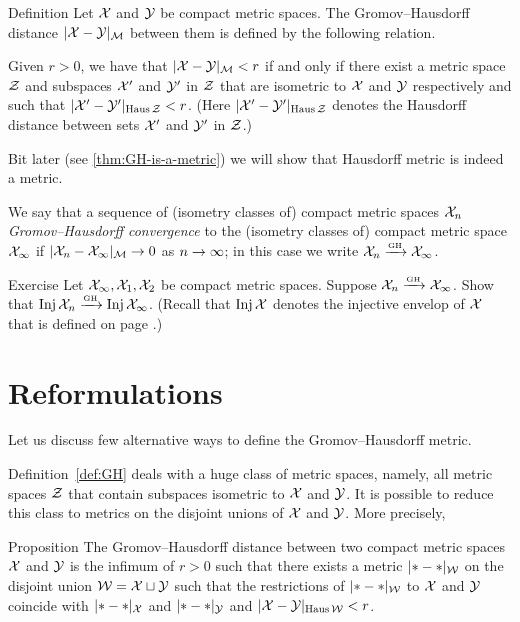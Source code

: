 \begin{thm}{Definition}\label{def:GH}
Let $\mathcal{X}$ and $\mathcal{Y}$ be compact metric spaces. 
The Gromov--Hausdorff distance $|\mathcal{X}-\mathcal{Y}|_{\mathcal{M}}$
between them is defined by the following
relation.
 
Given  $r > 0$, we have that $|\mathcal{X}-\mathcal{Y}|_{\mathcal{M}} < r$ if and only if there exist a metric
space $\mathcal{Z}$ and subspaces $\mathcal{X}'$ and $\mathcal{Y}'$ in $\mathcal{Z}$ that are isometric to $\mathcal{X}$ and $\mathcal{Y}$
respectively and such that $|\mathcal{X}'-\mathcal{Y}'|_{\operatorname{\rm Haus}\nolimits\mathcal{Z}} < r$. 
(Here $|\mathcal{X}'-\mathcal{Y}'|_{\operatorname{\rm Haus}\nolimits\mathcal{Z}}$ denotes the Hausdorff distance between sets $\mathcal{X}'$ and $\mathcal{Y}'$ in $\mathcal{Z}$.)
\end{thm}

Bit later (see \ref{thm:GH-is-a-metric}) we will show that Hausdorff metric is indeed a metric.

We say that a sequence
of (isometry classes of) compact metric spaces $\mathcal{X}_n$ 
\emph{Gromov--Hausdorff convergence} to the (isometry classes of)
compact metric space $\mathcal{X}_\infty$ if $|\mathcal{X}_n - \mathcal{X}_\infty|_{\mathcal{M}} \to 0$ as $n\z\to\infty$;
in this case we write $\mathcal{X}_n\xrightarrow{\mbox{\tiny\rm GH}} \mathcal{X}_\infty$.

\begin{thm}{Exercise}
Let $\mathcal{X}_\infty, \mathcal{X}_1, \mathcal{X}_2$ be compact metric spaces.
Suppose $\mathcal{X}_n\xrightarrow{\mbox{\tiny\rm GH}} \mathcal{X}_\infty$.
Show that $\mathop{\rm Inj}\nolimits\mathcal{X}_n\xrightarrow{\mbox{\tiny\rm GH}} \mathop{\rm Inj}\nolimits\mathcal{X}_\infty$.
(Recall that $\mathop{\rm Inj}\nolimits\mathcal{X}$ denotes the injective envelop of $\mathcal{X}$ that is defined on page \pageref{page:InjX}.)
\end{thm}


\section{Reformulations}

Let us discuss few alternative ways to define the Gromov--Hausdorff metric.

Definition~\ref{def:GH} deals with a huge class of metric spaces,
namely, all metric spaces $\mathcal{Z}$ that contain subspaces isometric to $\mathcal{X}$ and $\mathcal{Y}$.
It is possible to reduce this class to metrics on the disjoint unions of $\mathcal{X}$ and $\mathcal{Y}$. 
More precisely, 

\begin{thm}{Proposition}\label{prop:GH=X+Y}
The Gromov--Hausdorff distance between two compact metric spaces $\mathcal{X}$
and $\mathcal{Y}$ is the infimum of $r > 0$ such that there exists a metric
$|{*}-{*}|_{\mathcal{W}}$ on the disjoint union $\mathcal{W}=\mathcal{X}\sqcup \mathcal{Y}$ 
such that the restrictions of $|{*}-{*}|_{\mathcal{W}}$ to $\mathcal{X}$ and $\mathcal{Y}$
coincide with $|{*}-{*}|_{\mathcal{X}}$ and $|{*}-{*}|_{\mathcal{Y}}$ 
and $|\mathcal{X}-\mathcal{Y}|_{\operatorname{\rm Haus}\nolimits\mathcal{W}} < r$. 
\end{thm}


